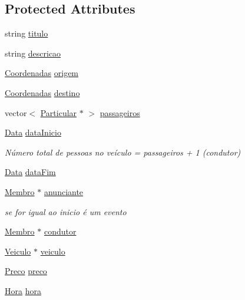 \subsection*{Protected Attributes}
\begin{DoxyCompactItemize}
\item 
string \hyperlink{class_anuncio_adb34bedd8220f42b9ee37662c21313e6}{titulo}
\item 
string \hyperlink{class_anuncio_aa6a9eb8d08cb06d16061b006eb2c8b97}{descricao}
\item 
\hyperlink{class_coordenadas}{Coordenadas} \hyperlink{class_anuncio_a9b3f8ac29ebf2a44e24ea2273064a7f5}{origem}
\item 
\hyperlink{class_coordenadas}{Coordenadas} \hyperlink{class_anuncio_acdac86595f84cfb8a2bf54c414857168}{destino}
\item 
vector$<$ \hyperlink{class_particular}{Particular} $\ast$ $>$ \hyperlink{class_anuncio_a76cdb1291df7bd8736141304d759ef35}{passageiros}
\item 
\hyperlink{class_data}{Data} \hyperlink{class_anuncio_abeb7d8c5fe5e7d127005044981a3cd3d}{data\+Inicio}
\begin{DoxyCompactList}\small\item\em Número total de pessoas no veículo = passageiros + 1 (condutor) \end{DoxyCompactList}\item 
\hyperlink{class_data}{Data} \hyperlink{class_anuncio_ac3b9182cc541cb68215f8aa09fb0e11a}{data\+Fim}
\item 
\hyperlink{class_membro}{Membro} $\ast$ \hyperlink{class_anuncio_a58250bfc8ab82d4308839b1e26213a0f}{anunciante}
\begin{DoxyCompactList}\small\item\em se for igual ao inicio é um evento \end{DoxyCompactList}\item 
\hyperlink{class_membro}{Membro} $\ast$ \hyperlink{class_anuncio_a8771818ef0855c6b70e2aca6c89e3177}{condutor}
\item 
\hyperlink{class_veiculo}{Veiculo} $\ast$ \hyperlink{class_anuncio_a3cffe1ce2024500bddaf07bd0f7ecc81}{veiculo}
\item 
\hyperlink{class_preco}{Preco} \hyperlink{class_anuncio_aa780fd8e07586a3af117fd20593fb1b4}{preco}
\item 
\hyperlink{class_hora}{Hora} \hyperlink{class_anuncio_aee851839cb45594b8ee550a032236cfe}{hora}
\end{DoxyCompactItemize}
